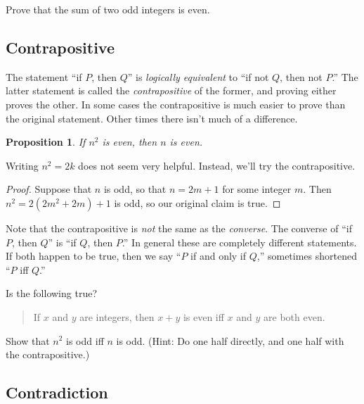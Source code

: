 \documentclass[12pt]{article}
\newtheorem{proposition}{Proposition}
\theoremstyle{definition}
\begin{document}
\begin{Exercise}
    Prove that the sum of two odd integers is even.
\end{Exercise}

\subsection*{Contrapositive}%

The statement ``if $P$, then $Q$'' is \emph{logically equivalent} to ``if not
$Q$, then not $P$.'' The latter statement is called the \emph{contrapositive}
of the former, and proving either proves the other. In some cases the
contrapositive is much easier to prove than the original statement. Other times
there isn't much of a difference.

\begin{proposition}
    If $n^2$ is even, then $n$ is even.
\end{proposition}

Writing $n^2 = 2k$ does not seem very helpful. Instead, we'll try the
contrapositive.

\begin{proof}
    Suppose that $n$ is odd, so that $n = 2m + 1$ for some integer $m$. Then
    $n^2 = 2(2m^2+ 2m) + 1$ is odd, so our original claim is true.
\end{proof}

Note that the contrapositive is \emph{not} the same as the \emph{converse}. The
converse of ``if $P$, then $Q$'' is ``if $Q$, then $P$.'' In general these are
completely different statements. If both happen to be true, then we say ``$P$
if and only if $Q$,'' sometimes shortened ``$P$ iff $Q$.''

\begin{Exercise}
    Is the following true?
    \begin{quote}
        If $x$ and $y$ are integers, then $x + y$ is even iff $x$ and $y$ are
        both even.
    \end{quote}
\end{Exercise}

\begin{Exercise}
    Show that $n^2$ is odd iff $n$ is odd. (Hint: Do one half directly, and one
    half with the contrapositive.)
\end{Exercise}

\subsection*{Contradiction}%
\end{document}
